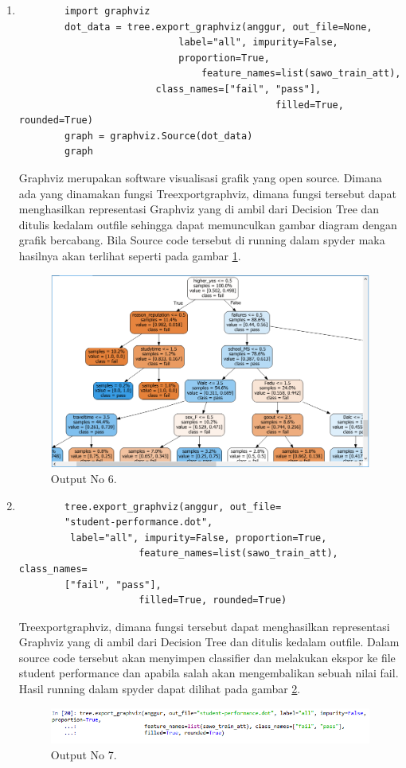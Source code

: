\begin{enumerate}
		\item
	\begin{verbatim}
		import graphviz
		dot_data = tree.export_graphviz(anggur, out_file=None, 
							label="all", impurity=False, 
							proportion=True,
                                feature_names=list(sawo_train_att), 
						class_names=["fail", "pass"], 
                               				 filled=True, rounded=True)
		graph = graphviz.Source(dot_data)
		graph
	\end{verbatim}
	\subitem Graphviz merupakan software visualisasi grafik yang open source. Dimana ada yang dinamakan fungsi 						    Treexportgraphviz, dimana fungsi tersebut dapat menghasilkan representasi Graphviz yang di ambil dari Decision Tree 			    dan ditulis kedalam outfile sehingga dapat memunculkan gambar diagram dengan grafik bercabang. Bila Source code 				    tersebut di running dalam spyder maka hasilnya akan terlihat seperti pada gambar \ref{YNO6}.
	\begin{figure}[ht]
		\centerline{\includegraphics[width=1\textwidth]{figures/YN/YNBerhasil6.png}}
		\caption{Output No 6.}
		\label{YNO6}
	\end{figure}

		\item
	\begin{verbatim}
		tree.export_graphviz(anggur, out_file=
		"student-performance.dot", 
		 label="all", impurity=False, proportion=True,
                     feature_names=list(sawo_train_att), class_names=
		["fail", "pass"], 
                     filled=True, rounded=True)
	\end{verbatim}
	\subitem Treexportgraphviz, dimana fungsi tersebut dapat menghasilkan representasi Graphviz yang di ambil dari Decision Tree 			    dan ditulis kedalam outfile. Dalam source code tersebut akan menyimpen classifier dan melakukan ekspor ke file student 			    performance dan apabila salah akan mengembalikan sebuah nilai fail. Hasil running dalam spyder dapat dilihat pada 				    gambar \ref{YNO7}.
	\begin{figure}[ht]
		\centerline{\includegraphics[width=1\textwidth]{figures/YN/YNBerhasil7.png}}
		\caption{Output No 7.}
		\label{YNO7}
	\end{figure}


\end{enumerate}
